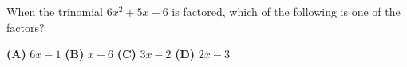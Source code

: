 When the trinomial $6x^2+5x-6$ is factored, which of the following is one of the factors?

\textbf{(A)} $6x-1$ \qquad \textbf{(B)} $x-6$ \qquad \textbf{(C)} $3x-2$ \qquad \textbf{(D)} $2x-3$
